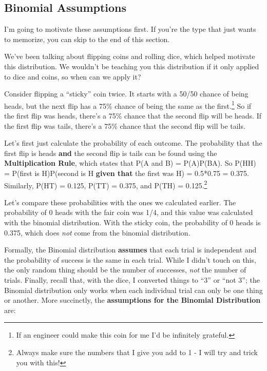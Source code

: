 \documentclass[
  letterpaper,
  DIV=11,
  numbers=noendperiod]{scrreprt}
\begin{document}
\hypertarget{binomial-assumptions}{%
\subsection{Binomial Assumptions}\label{binomial-assumptions}}

I'm going to motivate these assumptions first. If you're the type that
just wants to memorize, you can skip to the end of this section.

We've been talking about flipping coins and rolling dice, which helped
motivate this distribution. We wouldn't be teaching you this
distribution if it only applied to dice and coins, so when can we apply
it?

Consider flipping a ``sticky'' coin twice. It starts with a 50/50 chance
of being heads, but the next flip has a 75\% chance of being the same as
the first.\footnote{If an engineer could make this coin for me I'd be
  infinitely grateful.} So if the first flip was heads, there's a 75\%
chance that the second flip will be heads. If the first flip was tails,
there's a 75\% chance that the second flip will be tails.

Let's first just calculate the probability of each outcome. The
probability that the first flip is heads \textbf{and} the second flip is
tails can be found using the \textbf{Multiplication Rule}, which states
that P(A and B) = P(A)P(B\textbar A). So P(HH) = P(first is H)P(second
is H \textbf{given that} the first was H) = 0.5*0.75 = 0.375. Similarly,
P(HT) = 0.125, P(TT) = 0.375, and P(TH) = 0.125.\footnote{Always make
  sure the numbers that I give you add to 1 - I will try and trick you
  with this!}

Let's compare these probabilities with the ones we calculated earlier.
The probability of 0 heads with the fair coin was 1/4, and this value
was calculated with the binomial distribution. With the sticky coin, the
probability of 0 heads is 0.375, which does \emph{not} come from the
binomial distribution.

Formally, the Binomial distribution \textbf{assumes} that each trial is
independent and the probability of success is the same in each trial.
While I didn't touch on this, the only random thing should be the number
of successes, \emph{not} the number of trials. Finally, recall that,
with the dice, I converted things to ``3'' or ``not 3''; the Binomial
distribution only works when each individual trial can only be one thing
or another. More succinctly, the \textbf{assumptions for the Binomial
Distribution} are:
\end{document}
